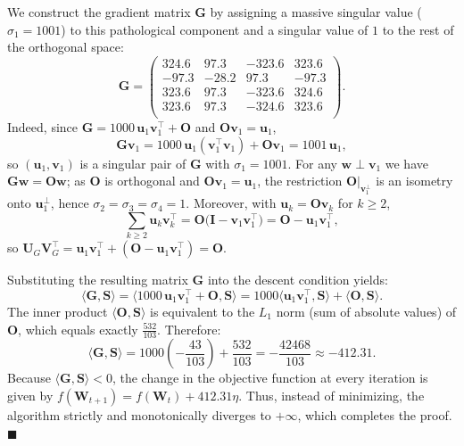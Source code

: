 \documentclass{article}
\begin{document}
We construct the gradient matrix $\mathbf{G}$ by assigning a massive singular value ($\sigma_1 = 1001$) to this pathological component and a singular value of $1$ to the rest of the orthogonal space:
\begin{equation}
    \mathbf{G} = \begin{pmatrix}
        324.6 & 97.3 & -323.6 & 323.6 \\
        -97.3 & -28.2 & 97.3 & -97.3 \\
        323.6 & 97.3 & -323.6 & 324.6 \\
        323.6 & 97.3 & -324.6 & 323.6 \\
      \end{pmatrix}.
\end{equation}
Indeed, since $\mathbf{G}=1000\,\mathbf{u}_1\mathbf{v}_1^\top+\mathbf{O}$ and $\mathbf{O}\mathbf{v}_1=\mathbf{u}_1$,
\[
\mathbf{G}\mathbf{v}_1 = 1000\,\mathbf{u}_1(\mathbf{v}_1^\top\mathbf{v}_1)+\mathbf{O}\mathbf{v}_1 = 1001\,\mathbf{u}_1,
\]
so $(\mathbf{u}_1,\mathbf{v}_1)$ is a singular pair of $\mathbf{G}$ with $\sigma_1=1001$. For any $\mathbf{w}\perp\mathbf{v}_1$ we have
$\mathbf{G}\mathbf{w}=\mathbf{O}\mathbf{w}$; as $\mathbf{O}$ is orthogonal and $\mathbf{O}\mathbf{v}_1=\mathbf{u}_1$, the restriction
$\mathbf{O}|_{\mathbf{v}_1^\perp}$ is an isometry onto $\mathbf{u}_1^\perp$, hence $\sigma_2=\sigma_3=\sigma_4=1$. Moreover, with
$\mathbf{u}_k=\mathbf{O}\mathbf{v}_k$ for $k\ge2$,
\[
\textstyle\sum_{k\ge2}\mathbf{u}_k\mathbf{v}_k^\top=\mathbf{O}\bigl(\mathbf{I}-\mathbf{v}_1\mathbf{v}_1^\top\bigr)=\mathbf{O}-\mathbf{u}_1\mathbf{v}_1^\top,  
\]
so $\mathbf{U}_G\mathbf{V}_G^\top=\mathbf{u}_1\mathbf{v}_1^\top+(\mathbf{O}-\mathbf{u}_1\mathbf{v}_1^\top)=\mathbf{O}$.

Substituting the resulting matrix $\mathbf{G}$ into the descent condition yields:
\begin{equation}
\langle \mathbf{G}, \mathbf{S} \rangle = \langle 1000 \, \mathbf{u}_1 \mathbf{v}_1^\top + \mathbf{O}, \mathbf{S} \rangle = 1000 \langle \mathbf{u}_1 \mathbf{v}_1^\top, \mathbf{S} \rangle + \langle \mathbf{O}, \mathbf{S} \rangle.
\end{equation}
The inner product $\langle \mathbf{O}, \mathbf{S} \rangle$ is equivalent to the $L_1$ norm (sum of absolute values) of $\mathbf{O}$, which equals exactly $\frac{532}{103}$. Therefore:
\begin{equation}
\langle \mathbf{G}, \mathbf{S} \rangle = 1000 \left(-\frac{43}{103}\right) + \frac{532}{103} = -\frac{42468}{103} \approx -412.31.
\end{equation}
Because $\langle \mathbf{G}, \mathbf{S} \rangle < 0$, the change in the objective function at every iteration is given by $f(\mathbf{W}_{t+1}) = f(\mathbf{W}_t) + 412.31 \eta$. Thus, instead of minimizing, the algorithm strictly and monotonically diverges to $+\infty$, which completes the proof. $\blacksquare$
\end{document}
